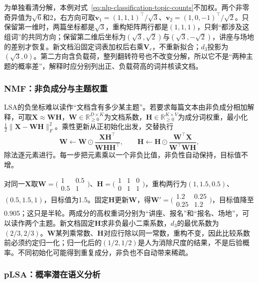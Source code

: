 为单独看清分解，本例对式~\eqref{eq:nlp-classification-topic-counts}不加权。两个非零奇异值为$\sqrt6$和2，右方向可取$\bm v_1=(1,1,1)^\top/\sqrt3$、$\bm v_2=(1,0,-1)^\top/\sqrt2$。只保留第一维时，两篇坐标都是$\sqrt3$，重构矩阵两行都是$(1,1,1)$，只剩“都涉及这组词”的共同方向；保留第二维后坐标为$(\sqrt3,\sqrt2)$与$(\sqrt3,-\sqrt2)$，讲座与场地的差别才恢复。新文档沿固定词表加权后右乘$\bm V_r$，不重新拟合；$d_3$投影为$(\sqrt3,0)$。第二方向含负载荷，整列翻转符号也不改变分解，所以它不是“两种主题的概率差”，解释时应分别列出正、负载荷高的词并核读文档。

\subsubsection{NMF：非负成分与主题权重}
\label{sec:nlp-classification-nmf}

LSA的负坐标难以读作“文档含有多少某主题”。若要求每篇文本由非负成分相加解释，可取$\bm X\approx\bm W\bm H$，$\bm W\in\mathbb R_{\geq0}^{D\times K}$为文档系数，$\bm H\in\mathbb R_{\geq0}^{K\times V}$为成分词权重，最小化$\frac12\|\bm X-\bm W\bm H\|_F^2$。乘性更新从正初始化出发，交替执行
\[
  \bm W\leftarrow\bm W\odot\frac{\bm X\bm H^\top}{\bm W\bm H\bm H^\top},\qquad
  \bm H\leftarrow\bm H\odot\frac{\bm W^\top\bm X}{\bm W^\top\bm W\bm H},
\]
除法逐元素进行。每一步把元素乘以一个非负比值，非负性自动保持，目标值不增。

对同一$\bm X$取$\bm W=\bigl(\begin{smallmatrix}1&0.5\\0.5&1\end{smallmatrix}\bigr)$、$\bm H=\bigl(\begin{smallmatrix}1&1&0\\0&1&1\end{smallmatrix}\bigr)$，重构两行为$(1,1.5,0.5)$、$(0.5,1.5,1)$，目标值为1.5。固定$\bm H$更新$\bm W$，得$\bm W'=\bigl(\begin{smallmatrix}1.2&0.25\\0.25&1.2\end{smallmatrix}\bigr)$，目标值降至0.905；这只是半轮。两成分的高权重词分别为“讲座、报名”和“报名、场地”，可以读作两个主题。新文档固定$\bm H$求非负最小二乘系数，$d_3$的最优系数为$(2/3,2/3)$。$\bm W$某列乘常数、$\bm H$对应行除以同一常数，重构不变，因此比较系数前必须约定归一化；归一化后的$(1/2,1/2)$是人为消除尺度的结果，不是后验概率。不同初始化可能得到重复成分，非负也不自动带来稀疏。

\subsubsection{pLSA：概率潜在语义分析}
\label{sec:nlp-classification-plsa}

